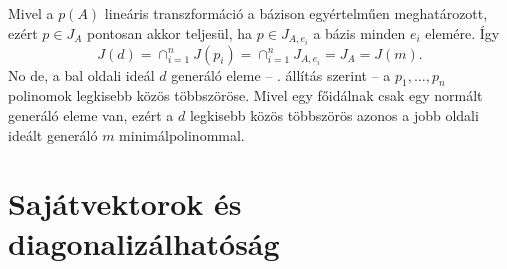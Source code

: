 \documentclass[9pt, a4paper, showtrims]{memoir}
\makeatletter
\renewenvironment{proof}[1][\proofname]
    {\par\pushQED{\qed}%
    \normalfont \topsep6\p@\@plus6\p@\relax
    \trivlist
    \item[\hskip\labelsep
        \itshape
    #1\@addpunct{:}]\ignorespaces}
    {\popQED\endtrivlist\@endpefalse}
\theoremstyle{plain}
\theoremstyle{remark}
\theoremstyle{definition}
\makeatother
\begin{document}
    \begin{proof}[Egy másik bizonyítás]
        Mivel a $p\left( A \right)$ lineáris transzformáció a bázison egyértelműen meghatározott, 
        ezért $p\in J_A$ pontosan akkor teljesül,
        ha $p\in J_{A,e_i}$ a bázis minden $e_i$ elemére.
        Így 
        \[
            J\left( d \right)
            =
            \cap_{i=1}^nJ(p_i)
            =
            \cap_{i=1}^nJ_{A,e_i}
            =
            J_A
            =
            J(m).
        \]
        No de, a bal oldali ideál $d$ generáló eleme 
        -- . állítás szerint --
        a $p_1,\dots,p_n$ polinomok legkisebb közös többszöröse.
        Mivel egy főidálnak csak egy normált generáló eleme van, 
        ezért a $d$ legkisebb közös többszörös azonos a jobb oldali ideált generáló $m$ minimálpolinommal.
    \end{proof}
    \section{Sajátvektorok és diagonalizálhatóság}
\end{document}
